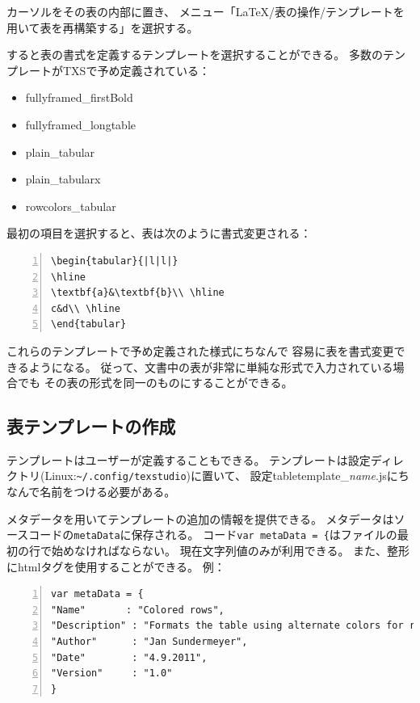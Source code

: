 カーソルをその表の内部に置き、
メニュー「LaTeX/表の操作/テンプレートを用いて表を再構築する」を選択する。

すると表の書式を定義するテンプレートを選択することができる。
多数のテンプレートがTXSで予め定義されている：

\begin{itemize}
\item
  fullyframed\_firstBold
\item
  fullyframed\_longtable
\item
  plain\_tabular
\item
  plain\_tabularx
\item
  rowcolors\_tabular
\end{itemize}

最初の項目を選択すると、表は次のように書式変更される：

\begin{lstlisting}[frame=single,numbers=left]
\begin{tabular}{|l|l|}
\hline
\textbf{a}&\textbf{b}\\ \hline
c&d\\ \hline
\end{tabular}
\end{lstlisting}

これらのテンプレートで予め定義された様式にちなんで
容易に表を書式変更できるようになる。
従って、文書中の表が非常に単純な形式で入力されている場合でも
その表の形式を同一のものにすることができる。

\subsection{表テンプレートの作成}

テンプレートはユーザーが定義することもできる。
テンプレートは設定ディレクトリ(Linux:\verb+~/.config/texstudio+)に置いて、
設定tabletemplate\_\emph{name}.jsにちなんで名前をつける必要がある。

メタデータを用いてテンプレートの追加の情報を提供できる。
メタデータはソースコードの\verb+metaData+に保存される。
コード\verb+var metaData = {+はファイルの最初の行で始めなければならない。
現在文字列値のみが利用できる。
また、整形にhtmlタグを使用することができる。 例：

\begin{lstlisting}[frame=single,breaklines=true,numbers=left]
var metaData = {
"Name"       : "Colored rows",
"Description" : "Formats the table using alternate colors for rows. <br> <code>\usepackage[table]{xcolor}</code> is necessary.", 
"Author"      : "Jan Sundermeyer",
"Date"        : "4.9.2011",
"Version"     : "1.0"
}
\end{lstlisting}

